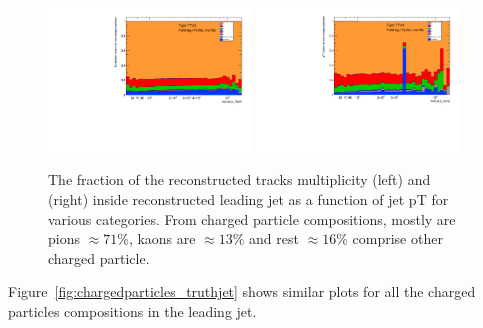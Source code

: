 \begin{figure}[b]
\centering
\includegraphics[width=0.48\textwidth,page=1]{figures/jetcompstudy_MultiplicityFraction.pdf}
\includegraphics[width=0.48\textwidth,page=1]{figures/jet_comp_study_powheg_Tight_pTFraction_mc16e.pdf}%
\caption {The fraction of the reconstructed tracks multiplicity (left) and \pT (right) inside reconstructed leading jet as a function of jet pT for various categories. From charged particle compositions, mostly are pions $\approx71$\%, kaons are $\approx13$\% and rest $\approx16$\% comprise other charged particle.}
\label{fig:chargedparticles}
\end{figure}

Figure~\ref{fig:chargedparticles_truthjet} shows similar plots for all the charged particles compositions in the leading jet. 

